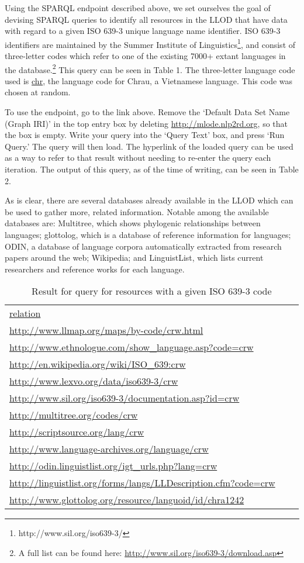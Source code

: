 Using the SPARQL endpoint described above, we set ourselves the goal of devising SPARQL queries to identify all resources in the LLOD that have data with regard to a given ISO 639-3 unique language name identifier. ISO 639-3 identifiers are maintained by the Summer Institute of Linguistics\footnote{http://www.sil.org/iso639-3/}, and consist of three-letter codes which refer to one of the existing 7000+ extant languages in the database.\footnote{A full list can be found here: \url{http://www.sil.org/iso639-3/download.asp}} This query can be seen in Table 1. The three-letter language code used is \url{chr}, the language code for Chrau, a Vietnamese language. This code was chosen at random. 

To use the endpoint, go to the link above. Remove the `Default Data Set Name (Graph IRI)' in the top entry box by deleting \url{http://mlode.nlp2rd.org}, so that the box is empty. Write your query into the `Query Text' box, and press `Run Query.' The query will then load. The hyperlink of the loaded query can be used as a way to refer to that result without needing to re-enter the query each iteration. The output of this query, as of the time of writing, can be seen in Table 2. 

As is clear, there are several databases already available in the LLOD which can be used to gather more, related information. Notable among the available databases are: Multitree, which shows phylogenic relationships between languages; glottolog, which is a database of reference information for languages; ODIN, a database of language corpora automatically extracted from research papers around the web; Wikipedia; and LinguistList, which lists current researchers and reference works for each language. 

\begin{table*}
\caption{Result for query for resources with a given ISO 639-3 code} \label{t1}
\begin{tabular}{lll}
\hline
\url{relation} \\
\url{http://www.llmap.org/maps/by-code/crw.html} \\
\url{http://www.ethnologue.com/show_language.asp?code=crw} \\
\url{http://en.wikipedia.org/wiki/ISO_639:crw} \\
\url{http://www.lexvo.org/data/iso639-3/crw} \\
\url{http://www.sil.org/iso639-3/documentation.asp?id=crw} \\
\url{http://multitree.org/codes/crw} \\
\url{http://scriptsource.org/lang/crw} \\
\url{http://www.language-archives.org/language/crw} \\
\url{http://odin.linguistlist.org/igt_urls.php?lang=crw} \\
\url{http://linguistlist.org/forms/langs/LLDescription.cfm?code=crw} \\
\url{http://www.glottolog.org/resource/languoid/id/chra1242} \\
\hline
\end{tabular}
\end{table*}

